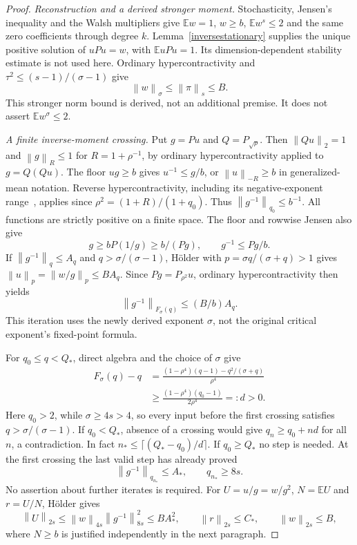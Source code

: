 \documentclass[11pt]{article}
\newcommand{\E}{\mathbb E}
\newcommand{\norm}[1]{\left\|#1\right\|}
\begin{document}
\begin{proof}
\emph{Reconstruction and a derived stronger moment.}
Stochasticity, Jensen's inequality and the Walsh multipliers give
$\E w=1$, $w\geq b$, $\E w^s\leq2$ and the same zero coefficients
through degree $k$. Lemma~\ref{inversestationary} supplies the unique
positive solution of $uPu=w$, with $\E uPu=1$. Its dimension-dependent
stability estimate is not used here. Ordinary hypercontractivity
\cite{mos,odonnell} and $\tau^2\leq(s-1)/(\sigma-1)$ give
\begin{equation}\label{densityhighermoment}
 \norm w_\sigma\leq\norm\pi_s\leq B.
\end{equation}
This stronger norm bound is derived, not an additional premise. It does
not assert $\E w^\sigma\leq2$.

\emph{A finite inverse-moment crossing.}
Put $g=Pu$ and $Q=P_{\sqrt\rho}$. Then $\norm{Qu}_2=1$ and
$\norm g_R\leq1$ for $R=1+\rho^{-1}$, by ordinary
hypercontractivity applied to $g=Q(Qu)$. The floor $ug\geq b$ gives
$u^{-1}\leq g/b$, or $\norm u_{-R}\geq b$ in generalized-mean
notation. Reverse hypercontractivity, including its negative-exponent
range~\cite{mos}, applies since
$\rho^2=(1+R)/(1+q_0)$. Thus
$\norm{g^{-1}}_{q_0}\leq b^{-1}$.
All functions are strictly positive on a finite space.
The floor and rowwise Jensen also give
\[
 g\geq bP(1/g)\geq b/(Pg),\qquad g^{-1}\leq Pg/b.
\]
If $\norm{g^{-1}}_q\leq A_q$ and $q>\sigma/(\sigma-1)$,
H\"older with $p=\sigma q/(\sigma+q)>1$ gives
$\norm u_p=\norm{w/g}_p\leq BA_q$.
Since $Pg=P_{\rho^2}u$, ordinary hypercontractivity then yields
\begin{equation}\label{densitybootstrap}
 \norm{g^{-1}}_{F_\sigma(q)}\leq(B/b)A_q.
\end{equation}
This iteration uses the newly derived exponent $\sigma$, not the original
critical exponent's fixed-point formula.

For $q_0\leq q<Q_*$, direct algebra and the choice of $\sigma$ give
\begin{align*}
 F_\sigma(q)-q
 &=\frac{(1-\rho^4)(q-1)-q^2/(\sigma+q)}{\rho^4}\\
 &\geq\frac{(1-\rho^4)(q_0-1)}{2\rho^4}=:d>0.
\end{align*}
Here $q_0>2$, while $\sigma\geq4s>4$, so every input before the
first crossing satisfies $q>\sigma/(\sigma-1)$. If $q_0<Q_*$, absence
of a crossing would give $q_n\geq q_0+nd$ for all $n$, a contradiction.
In fact $n_*\leq\lceil(Q_*-q_0)/d\rceil$. If $q_0\geq Q_*$ no
step is needed. At the first crossing the last valid step has already
proved
\[
 \norm{g^{-1}}_{q_{n_*}}\leq A_*,\qquad q_{n_*}\geq8s.
\]
No assertion about further iterates is required.
For $U=u/g=w/g^2$, $N=\E U$ and $r=U/N$, H\"older gives
\begin{equation}\label{densityratiomoment}
 \norm U_{2s}\leq\norm w_{4s}\norm{g^{-1}}_{8s}^2
       \leq BA_*^2,\qquad \norm r_{2s}\leq C_*,
       \qquad \norm w_{2s}\leq B,
\end{equation}
where $N\geq b$ is justified independently in the next paragraph.


\end{proof}
\end{document}
